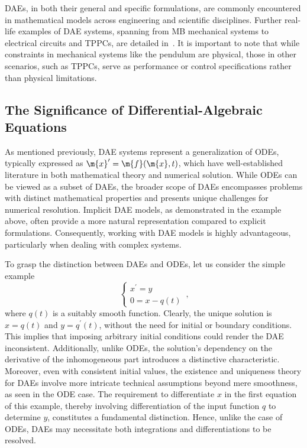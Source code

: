 %
\acp{DAE}, in both their general and specific formulations, are commonly encountered in mathematical models across engineering and scientific disciplines. Further real-life examples of \ac{DAE} systems, spanning from \ac{MB} mechanical systems to electrical circuits and \acp{TPPC}, are detailed in~\cite{brenan1995numerical}. It is important to note that while constraints in mechanical systems like the pendulum are physical, those in other scenarios, such as \acp{TPPC}, serve as performance or control specifications rather than physical limitations.

\subsection{The Significance of Differential-Algebraic Equations}

As mentioned previously, \ac{DAE} systems represent a generalization of \acp{ODE}, typically expressed as $\m{x}^{\prime} = \m{f}(\m{x}, t)$, which have well-established literature in both mathematical theory and numerical solution. While \acp{ODE} can be viewed as a subset of \acp{DAE}, the broader scope of \acp{DAE} encompasses problems with distinct mathematical properties and presents unique challenges for numerical resolution. Implicit \ac{DAE} models, as demonstrated in the example above, often provide a more natural representation compared to explicit formulations. Consequently, working with \ac{DAE} models is highly advantageous, particularly when dealing with complex systems.

To grasp the distinction between \acp{DAE} and \acp{ODE}, let us consider the simple example
%
\begin{equation*}
  \begin{cases}
  x^{\prime} = y \\
  0 = x - q(t)
  \end{cases} \, \text{,}
\end{equation*}
%
where $q(t)$ is a suitably smooth function. Clearly, the unique solution is $x = q(t)$ and $y = q^{\prime}(t)$, without the need for initial or boundary conditions. This implies that imposing arbitrary initial conditions could render the \ac{DAE} inconsistent. Additionally, unlike \acp{ODE}, the solution's dependency on the derivative of the inhomogeneous part introduces a distinctive characteristic. Moreover, even with consistent initial values, the existence and uniqueness theory for \acp{DAE} involve more intricate technical assumptions beyond mere smoothness, as seen in the \ac{ODE} case. The requirement to differentiate $x$ in the first equation of this example, thereby involving differentiation of the input function $q$ to determine $y$, constitutes a fundamental distinction. Hence, unlike the case of \acp{ODE}, \acp{DAE} may necessitate both integrations and differentiations to be resolved.

